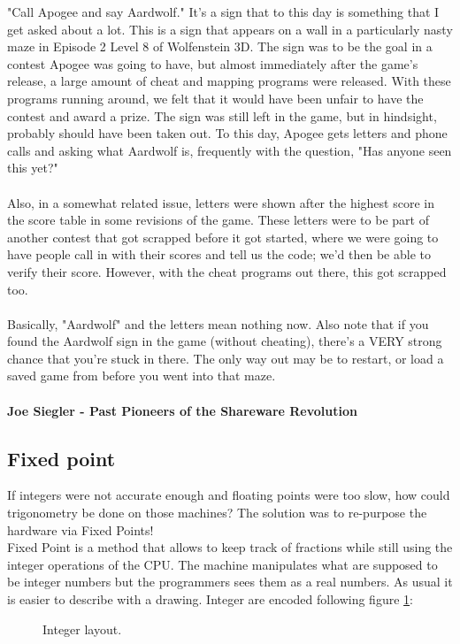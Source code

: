 \begin{fancyquotes}
"Call Apogee and say Aardwolf."  It's a sign that to this day is something
that I get asked about a lot.  This is a sign that appears on a wall in a
particularly nasty maze in Episode 2 Level 8 of Wolfenstein 3D.  The sign
was to be the goal in a contest Apogee was going to have, but almost
immediately after the game's release, a large amount of cheat and mapping
programs were released.  With these programs running around, we felt that
it would have been unfair to have the contest and award a prize.  The sign
was still left in the game, but in hindsight, probably should have been
taken out.  To this day, Apogee gets letters and phone calls and asking
what Aardwolf is, frequently with the question, "Has anyone seen this yet?"\\
\\
Also, in a somewhat related issue, letters were shown after the highest score
in the score table in some revisions of the game.  These letters were to be
part of another contest that got scrapped before it got started, where we were
going to have people call in with their scores and tell us the code; we'd then
be able to verify their score.  However, with the cheat programs out there,
this got scrapped too.\\
\\
Basically, "Aardwolf" and the letters mean nothing now.  Also note that if
you found the Aardwolf sign in the game (without cheating), there's a VERY
strong chance that you're stuck in there.  The only way out may be to restart,
or load a saved game from before you went into that maze.\\
\\
\textbf{Joe Siegler - Past Pioneers of the Shareware Revolution}
\end{fancyquotes}













\subsection{Fixed point}
If integers were not accurate enough and floating points were too slow, how could trigonometry be done on those machines? The solution was to re-purpose the hardware via Fixed Points!\\
Fixed Point is a method that allows to keep track of fractions while still using the integer operations of the CPU. The machine manipulates what are supposed to be integer numbers but the programmers sees them as a real numbers. As usual it is easier to describe with a drawing. Integer are encoded following figure \ref{fig:int_layout}:
\begin{figure}[H]
\centering
 
 \caption{Integer layout.} \label{fig:int_layout}
 \end{figure}

